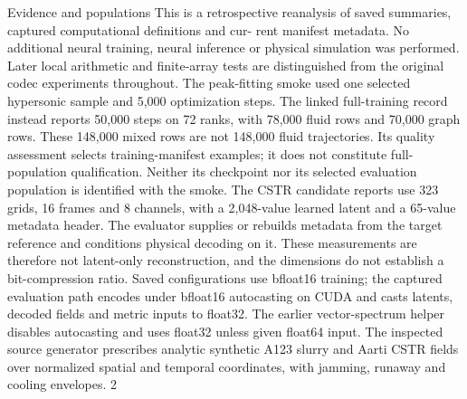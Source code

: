 \documentclass[11pt]{article}
\begin{document}
Evidence and populations
This is a retrospective reanalysis of saved summaries, captured computational definitions and cur-
rent manifest metadata. No additional neural training, neural inference or physical simulation was
performed. Later local arithmetic and finite-array tests are distinguished from the original codec
experiments throughout.
The peak-fitting smoke used one selected hypersonic sample and 5,000 optimization steps. The
linked full-training record instead reports 50,000 steps on 72 ranks, with 78,000 fluid rows and 70,000
graph rows. These 148,000 mixed rows are not 148,000 fluid trajectories. Its quality assessment
selects training-manifest examples; it does not constitute full-population qualification. Neither its
checkpoint nor its selected evaluation population is identified with the smoke.
The CSTR candidate reports use 323 grids, 16 frames and 8 channels, with a 2,048-value learned
latent and a 65-value metadata header. The evaluator supplies or rebuilds metadata from the target
reference and conditions physical decoding on it. These measurements are therefore not latent-only
reconstruction, and the dimensions do not establish a bit-compression ratio. Saved configurations
use bfloat16 training; the captured evaluation path encodes under bfloat16 autocasting on CUDA
and casts latents, decoded fields and metric inputs to float32. The earlier vector-spectrum helper
disables autocasting and uses float32 unless given float64 input.
The inspected source generator prescribes analytic synthetic A123 slurry and Aarti CSTR fields
over normalized spatial and temporal coordinates, with jamming, runaway and cooling envelopes.
2
\end{document}

